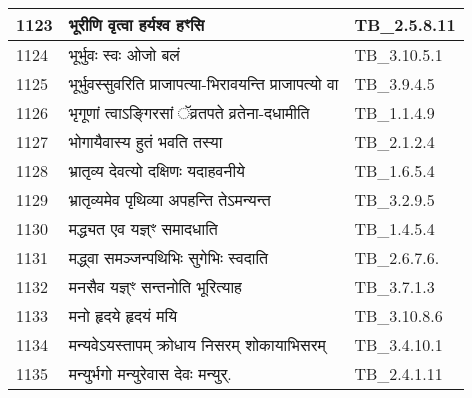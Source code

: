 \documentclass[17pt]{extarticle}
\begin{document}
\begin{longtable}{||p{0.4in}||p{4.9in}||p{0.9in}||}
    1123 & भूरीणि वृत्वा हर्यश्व हꣳसि & TB\_2.5.8.11       \\
    
    \hline
        
    1124 & भूर्भुवः स्वः ओजो बलं & TB\_3.10.5.1       \\
    
    \hline
        
    1125 & भूर्भुवस्सुवरिति प्राजापत्या{-}भिरावयन्ति प्राजापत्यो वा & TB\_3.9.4.5       \\
    
    \hline
        
    1126 & भृगूणां त्वाऽङ्गिरसां ॅव्रतपते व्रतेना{-}दधामीति & TB\_1.1.4.9       \\
    
    \hline
        
    1127 & भोगायैवास्य हुतं भवति तस्या & TB\_2.1.2.4       \\
    
    \hline
        
    1128 & भ्रातृव्य देवत्यो दक्षिणः यदाहवनीये & TB\_1.6.5.4       \\
    
    \hline
        
    1129 & भ्रातृव्यमेव पृथिव्या अपहन्ति तेऽमन्यन्त & TB\_3.2.9.5       \\
    
    \hline
        
    1130 & मद्ध्यत एव यज्ञ्ꣳ समादधाति & TB\_1.4.5.4       \\
    
    \hline
        
    1131 & मद्ध्वा समञ्जन्पथिभिः सुगेभिः स्वदाति & TB\_2.6.7.6.       \\
    
    \hline
        
    1132 & मनसैव यज्ञ्ꣳ सन्तनोति भूरित्याह & TB\_3.7.1.3       \\
    
    \hline
        
    1133 & मनो हृदये हृदयं मयि & TB\_3.10.8.6       \\
    
    \hline
        
    1134 & मन्यवेऽयस्तापम् क्रोधाय निसरम् शोकायाभिसरम् & TB\_3.4.10.1       \\
    
    \hline
        
    1135 & मन्युर्भगो मन्युरेवास देवः मन्युर्. & TB\_2.4.1.11       \\
    

\end{longtable}
\end{document}
